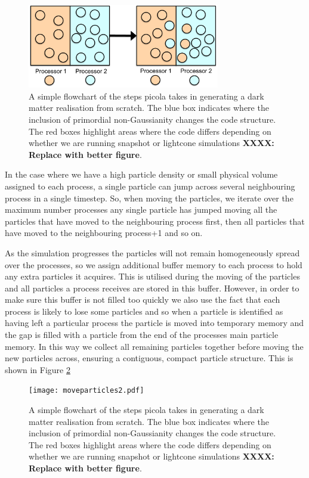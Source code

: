 \documentclass[5p,authoryear]{elsarticle}
\begin{document}
\begin{figure}
\centering
\includegraphics[width=84mm]{moveparticles.pdf}
  \caption{A simple flowchart of the steps {\sc picola} takes in generating a dark matter realisation from scratch. The blue box indicates where the inclusion of primordial non-Gaussianity changes the code structure. The red boxes highlight areas where the code differs depending on whether we are running snapshot or lightcone simulations \textbf{XXXX: Replace with better figure}.}
  \label{moveparticles}
\end{figure}

In the case where we have a high particle density or small physical volume assigned to each process, a single particle can jump across several neighbouring process in a single timestep. So, when moving the particles, we iterate over the maximum number processes any single particle has jumped moving all the particles that have moved to the neighbouring process first, then all particles that have moved to the neighbouring process+1 and so on.

As the simulation progresses the particles will not remain homogeneously spread over the processes, so we assign additional buffer memory to each process to hold any extra particles it acquires. This is utilised during the moving of the particles and all particles a process receives are stored in this buffer. However, in order to make sure this buffer is not filled too quickly we also use the fact that each process is likely to lose some particles and so when a particle is identified as having left a particular process the particle is moved into temporary memory and the gap is filled with a particle from the end of the processes main particle memory. In this way we collect all remaining particles together before moving the new particles across, ensuring a contiguous, compact particle structure. This is shown in Figure \ref{moveparticles2}

\begin{figure}
\centering
\texttt{[image: moveparticles2.pdf]}
  \caption{A simple flowchart of the steps {\sc picola} takes in generating a dark matter realisation from scratch. The blue box indicates where the inclusion of primordial non-Gaussianity changes the code structure. The red boxes highlight areas where the code differs depending on whether we are running snapshot or lightcone simulations \textbf{XXXX: Replace with better figure}.}
  \label{moveparticles2}
\end{figure}
\end{document}
